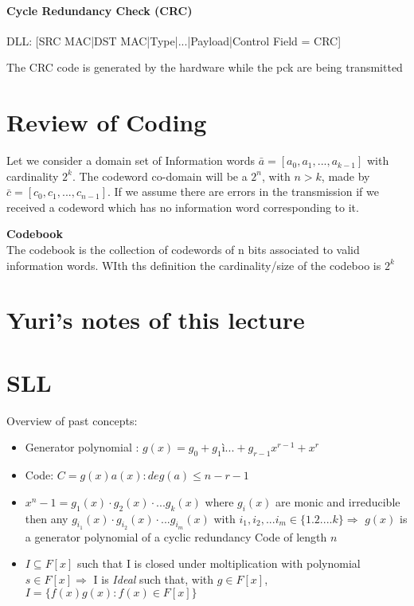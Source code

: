 \paragraph{Cycle Redundancy Check (CRC)}
DLL: [SRC MAC|DST MAC|Type|...|Payload|Control Field = CRC]

The CRC code is generated by the hardware while the pck are being transmitted


\section{Review of Coding}

Let we consider a domain set of Information words $\bar{a} = [a_0,a_1,...,a_{k-1}]$ with cardinality $2^k$. The codeword co-domain will be a $2^n$, with $n > k$, made by $\bar{c} = [c_0,c_1, ..., c_{n-1}]$.
If we assume there are errors in the transmission if we received a codeword which has no information word corresponding to it.

\begin{definition}{\textbf{Codebook}\\}
The codebook is the collection of codewords of n bits associated to valid information words. WIth ths definition the cardinality/size of the codeboo is $2^k$
\end{definition}
\section{Yuri's notes of this lecture }

\section{SLL}
Overview of past concepts:
\begin{itemize}
\item Generator polynomial : $g(x) = g_0 + g_1 ì ... + g_{r-1}x^{r-1} + x^r$
\item Code: $C = {g(x)a(x) : deg(a) \leq n - r - 1}$
\item $x^n-1 = g_1(x)\cdot g_2(x)\cdot ... g_k(x)$ where $g_i(x)$ are monic and irreducible then any $g_{i_1}(x)\cdot g_{i_2}(x)\cdot ... g_{i_m}(x)$ with $i_1, i_2, ... i_m \in \{1.2.... k\} \Rightarrow$ $g(x)$ is a generator polynomial of a cyclic redundancy Code of length $n$ 
\item $I \subseteq F[x]$ such that I is closed under moltiplication with polynomial $s \in F[x] \Rightarrow$ I is \emph{Ideal} such that, with $g \in F[x]$, $I = \{f(x)g(x) : f(x) \in F[x]\}$  
\end{itemize}

